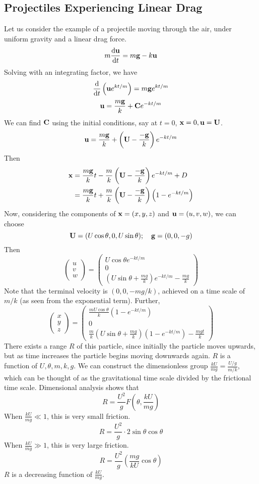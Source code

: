\subsection{Projectiles Experiencing Linear Drag}
Let us consider the example of a projectile moving through the air, under uniform gravity and a linear drag force.
\[
	m \frac{\dd \vb u}{\dd{t}} = m\vb g - k\vb u
\]
Solving with an integrating factor, we have
\[
	\frac{\dd}{\dd{t}}\left( \vb u e^{kt/m} \right) = m\vb g e^{kt/m}
\]
\[
	\vb u = \frac{m\vb g}{k} + \vb C e^{-kt/m}
\]
We can find \(\vb C\) using the initial conditions, say at \(t=0\), \(\vb x = 0, \vb u = \vb U\).
\[
	\vb u = \frac{m\vb g}{k} + \left( \vb U - \frac{-\vb g}{k} \right) e^{-kt/m}
\]
Then
\begin{align*}
	\vb x & = \frac{m\vb g}{k}t - \frac{m}{k}\left( \vb U - \frac{-\vb g}{k} \right) e^{-kt/m} + D               \\
	      & =\frac{m\vb g}{k}t + \frac{m}{k}\left( \vb U - \frac{-\vb g}{k} \right) \left( 1 - e^{-kt/m} \right)
\end{align*}
Now, considering the components of \(\vb x = (x, y, z)\) and \(\vb u = (u, v, w)\), we can choose
\[
	\vb U = (U \cos \theta, 0, U\sin\theta);\quad \vb g = (0, 0, -g)
\]
Then
\[
	\begin{pmatrix}
		u \\ v \\ w
	\end{pmatrix} = \begin{pmatrix}
		U\cos\theta e^{-kt/m} \\
		0                     \\
		\left(U \sin\theta + \frac{mg}{k}\right)e^{-kt/m} - \frac{mg}{k}
	\end{pmatrix}
\]
Note that the terminal velocity is \((0, 0, -mg/k)\), achieved on a time scale of \(m/k\) (as seen from the exponential term).
Further,
\[
	\begin{pmatrix}
		x \\ y \\ z
	\end{pmatrix} = \begin{pmatrix}
		\frac{mU\cos\theta}{k}\left( 1 - e^{-kt/m} \right) \\
		0                                                  \\
		\frac{m}{k}\left( U \sin\theta + \frac{mg}{k} \right)\left( 1 - e^{-kt/m} \right) - \frac{mgt}{k}
	\end{pmatrix}
\]
There exists a range \(R\) of this particle, since initially the particle moves upwards, but as time increases the particle begins moving downwards again.
\(R\) is a function of \(U, \theta, m, k, g\).
We can construct the dimensionless group \(\frac{kU}{mg} = \frac{U/g}{m/k}\), which can be thought of as the gravitational time scale divided by the frictional time scale.
Dimensional analysis shows that
\[
	R = \frac{U^2}{g}F\left(\theta, \frac{kU}{mg}\right)
\]
When \(\frac{kU}{mg} \ll 1\), this is very small friction.
\[
	R = \frac{U^2}{g}\cdot 2\sin\theta\cos\theta
\]
When \(\frac{kU}{mg} \gg 1\), this is very large friction.
\[
	R = \frac{U^2}{g} \left( \frac{mg}{kU}\cos\theta \right)
\]
\(R\) is a decreasing function of \(\frac{kU}{mg}\).
